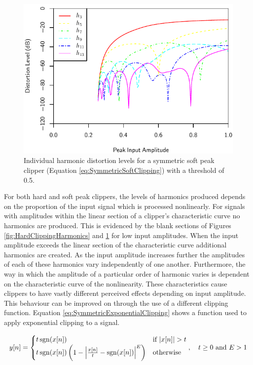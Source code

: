			\begin{figure}[h!]
				\centering
				\includegraphics{chapter5/Images/SoftClippingHarmonics.pdf}
				\caption{Individual harmonic distortion levels for a symmetric soft peak clipper (Equation
					 \ref{eq:SymmetricSoftClipping}) with a threshold of 0.5.}
				\label{fig:SoftClippingHarmonics}
			\end{figure}

			For both hard and soft peak clippers, the levels of harmonics produced depends on the proportion of
			the input signal which is processed nonlinearly. For signals with amplitudes within the linear
			section of a clipper's characteristic curve no harmonics are produced. This is evidenced by the
			blank sections of Figures \ref{fig:HardClippingHarmonics} and \ref{fig:SoftClippingHarmonics} for
			low input amplitudes. When the input amplitude exceeds the linear section of the characteristic
			curve additional harmonics are created. As the input amplitude increases further the amplitudes of
			each of these harmonics vary independently of one another. Furthermore, the way in which the
			amplitude of a particular order of harmonic varies is dependent on the characteristic curve of the
			nonlinearity. These characteristics cause clippers to have vastly different perceived effects
			depending on input amplitude. This behaviour can be improved on through the use of a different
			clipping function. Equation \ref{eq:SymmetricExponentialClipping} shows a function used to apply
			exponential clipping to a signal.
			
			\begin{equation}
				y[n] = \begin{cases}
					t\operatorname{sgn}(x[n]) & \text{if $\left|x[n]\right| > t$} \\
					t\operatorname{sgn}(x[n]) \left(1 - \left|\frac{x[n]}{t} - \operatorname{sgn}(x[n])\right|^{E} \right) &
						\text{otherwise}
				\end{cases}, \quad t \geq 0 \ \text{and} \ E > 1
				\label{eq:SymmetricExponentialClipping}
			\end{equation}

